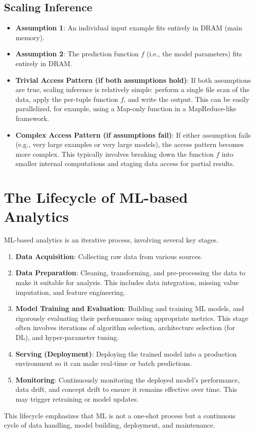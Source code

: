 \documentclass{article}
\begin{document}
\subsection*{Scaling Inference}
\begin{itemize}
    \item \textbf{Assumption 1}: An individual input example fits entirely in DRAM (main memory).
    \item \textbf{Assumption 2}: The prediction function $f$ (i.e., the model parameters) fits entirely in DRAM.
    \item \textbf{Trivial Access Pattern (if both assumptions hold)}: If both assumptions are true, scaling inference is relatively simple: perform a single file scan of the data, apply the per-tuple function $f$, and write the output. This can be easily parallelized, for example, using a Map-only function in a MapReduce-like framework.
    \item \textbf{Complex Access Pattern (if assumptions fail)}: If either assumption fails (e.g., very large examples or very large models), the access pattern becomes more complex. This typically involves breaking down the function $f$ into smaller internal computations and staging data access for partial results.
\end{itemize}

\section*{The Lifecycle of ML-based Analytics}
ML-based analytics is an iterative process, involving several key stages.

\begin{enumerate}
    \item \textbf{Data Acquisition}: Collecting raw data from various sources.
    \item \textbf{Data Preparation}: Cleaning, transforming, and pre-processing the data to make it suitable for analysis. This includes data integration, missing value imputation, and feature engineering.
    \item \textbf{Model Training and Evaluation}: Building and training ML models, and rigorously evaluating their performance using appropriate metrics. This stage often involves iterations of algorithm selection, architecture selection (for DL), and hyper-parameter tuning.
    \item \textbf{Serving (Deployment)}: Deploying the trained model into a production environment so it can make real-time or batch predictions.
    \item \textbf{Monitoring}: Continuously monitoring the deployed model's performance, data drift, and concept drift to ensure it remains effective over time. This may trigger retraining or model updates.
\end{enumerate}
This lifecycle emphasizes that ML is not a one-shot process but a continuous cycle of data handling, model building, deployment, and maintenance.
\end{document}
